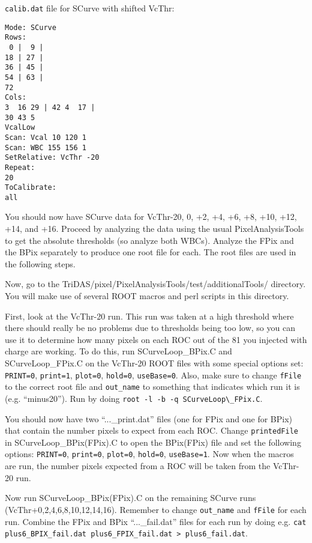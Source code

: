 \verb|calib.dat| file for SCurve with shifted VcThr:
\begin{verbatim}
Mode: SCurve
Rows:
 0 |  9 |
18 | 27 |
36 | 45 |
54 | 63 |
72
Cols:
3  16 29 | 42 4  17 |
30 43 5
VcalLow
Scan: Vcal 10 120 1
Scan: WBC 155 156 1
SetRelative: VcThr -20
Repeat:
20
ToCalibrate:
all
\end{verbatim}

You should now have SCurve data for VcThr-20, 0, +2, +4, +6, +8, +10, +12, +14, and +16.
Proceed by analyzing the data using the usual PixelAnalysisTools to get the absolute thresholds
(so analyze both WBCs).  Analyze the FPix and the BPix separately to produce one root file
for each.  The root files are used in the following steps.

Now, go to the TriDAS/pixel/PixelAnalysisTools/test/additionalTools/
 directory.  You will make use of several ROOT macros and perl 
scripts in this directory.  

First, look at the VcThr-20 run.  This run was taken at a high threshold where
there should really be no problems due to thresholds being too low, so you can use it
to determine how many pixels on each ROC out of the 81 you injected with charge are working.
To do this, run SCurveLoop\_BPix.C and SCurveLoop\_FPix.C 
on the VcThr-20 ROOT files with some special options set: 
\verb|PRINT=0|, \verb|print=1|, \verb|plot=0|, \verb|hold=0|, \verb|useBase=0|. 
Also, make sure to change \verb|fFile| 
to the correct root file and \verb|out_name| to something that indicates 
which run it is (e.g. ``minus20'').  Run by doing \verb|root -l -b -q SCurveLoop\_FPix.C|.

You should now have two ``...\_print.dat'' files (one for FPix and one for BPix) 
that contain the number pixels to expect from each ROC.  
Change \verb|printedFile| in SCurveLoop\_BPix(FPix).C to open the BPix(FPix) file
and set the following options:
\verb|PRINT=0|, \verb|print=0|, \verb|plot=0|, \verb|hold=0|, \verb|useBase=1|.
Now when the macros are run, the number pixels expected from a ROC will be
taken from the VcThr-20 run.

Now run SCurveLoop\_BPix(FPix).C on the remaining SCurve runs (VcThr+0,2,4,6,8,10,12,14,16).
Remember to change \verb|out_name| and \verb|fFile| for each run.
Combine the FPix and BPix ``...\_fail.dat'' files for each run by doing e.g. 
\verb|cat plus6_BPIX_fail.dat plus6_FPIX_fail.dat > plus6_fail.dat|.


